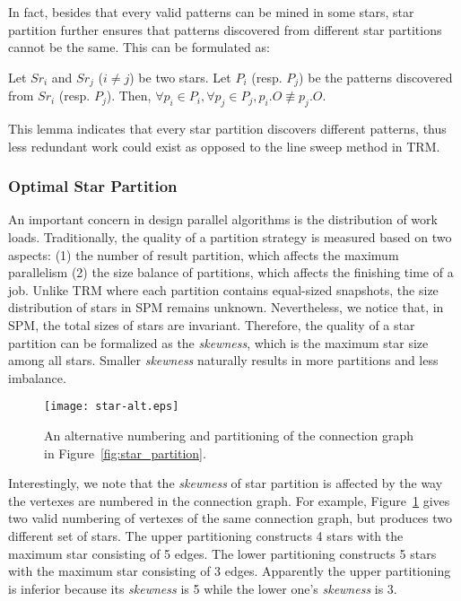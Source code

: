 In fact, besides that every valid patterns can be
mined in some stars, star partition further ensures
that patterns discovered
from different star partitions cannot be the same. 
This can be formulated as:

\begin{lemma}
\label{LEM:SPM_CORRECT}
Let $Sr_i$ and $Sr_j$ ($i\neq j$) be two stars. Let $P_i$ (resp. $P_j$) be 
the patterns discovered from $Sr_i$ (resp. $P_j$). 
Then, $\forall p_i \in P_i, \forall p_j \in P_j, p_i.O \not\equiv p_j.O$.
\end{lemma}

This lemma indicates that every star partition discovers different patterns,
thus less redundant work could exist as opposed to the line sweep method in TRM.

\subsubsection{Optimal Star Partition}
An important concern in design parallel algorithms is 
the distribution of work loads.  
Traditionally, the quality of a partition strategy 
is measured based on two aspects: (1) the number of result partition, which
affects the maximum parallelism
(2) the size balance of partitions, which affects the finishing
time of a job. Unlike TRM where each partition
contains equal-sized snapshots, the size distribution 
of stars in SPM remains unknown.
Nevertheless, we notice that, in SPM, the total sizes of 
stars are invariant. Therefore, the quality of a star partition
can be formalized as the \emph{skewness}, which is the maximum star size
among all stars. Smaller \emph{skewness} naturally results in more partitions
and less imbalance.


\begin{figure}[h]
\centering
\texttt{[image: star-alt.eps]}
\caption{An alternative numbering and partitioning of the connection graph in Figure~\ref{fig:star_partition}.}
\label{fig:star-alt}
\end{figure}

Interestingly, we note that the \emph{skewness} of star partition is affected by
the way the vertexes are numbered in the connection graph. For example,
Figure~\ref{fig:star-alt} gives two valid numbering of vertexes 
of the same connection graph, but produces two different set of stars. 
The upper partitioning constructs 4 stars with the maximum star consisting of 5 edges.
The lower partitioning constructs 5 stars with the maximum star consisting of 3 edges.
Apparently the upper partitioning is inferior because its \emph{skewness} is 5 while the
lower one's \emph{skewness} is 3.

